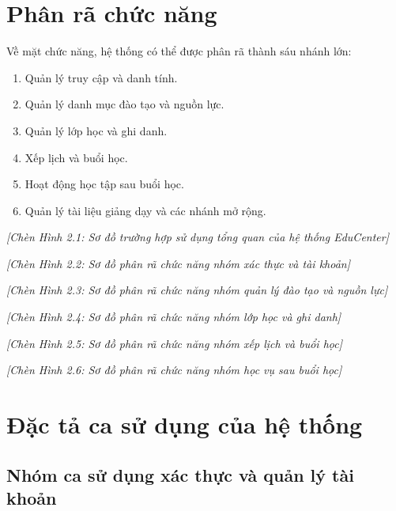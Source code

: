 \documentclass[../DoAn.tex]{subfiles}
\begin{document}
\section{Phân rã chức năng}
\label{section:2.3}

Về mặt chức năng, hệ thống có thể được phân rã thành sáu nhánh lớn:
\begin{enumerate}
    \item Quản lý truy cập và danh tính.
    \item Quản lý danh mục đào tạo và nguồn lực.
    \item Quản lý lớp học và ghi danh.
    \item Xếp lịch và buổi học.
    \item Hoạt động học tập sau buổi học.
    \item Quản lý tài liệu giảng dạy và các nhánh mở rộng.
\end{enumerate}

\textit{[Chèn Hình 2.1: Sơ đồ trường hợp sử dụng tổng quan của hệ thống EduCenter]}

\textit{[Chèn Hình 2.2: Sơ đồ phân rã chức năng nhóm xác thực và tài khoản]}

\textit{[Chèn Hình 2.3: Sơ đồ phân rã chức năng nhóm quản lý đào tạo và nguồn lực]}

\textit{[Chèn Hình 2.4: Sơ đồ phân rã chức năng nhóm lớp học và ghi danh]}

\textit{[Chèn Hình 2.5: Sơ đồ phân rã chức năng nhóm xếp lịch và buổi học]}

\textit{[Chèn Hình 2.6: Sơ đồ phân rã chức năng nhóm học vụ sau buổi học]}

\section{Đặc tả ca sử dụng của hệ thống}
\label{section:2.4}

\subsection{Nhóm ca sử dụng xác thực và quản lý tài khoản}
\end{document}

